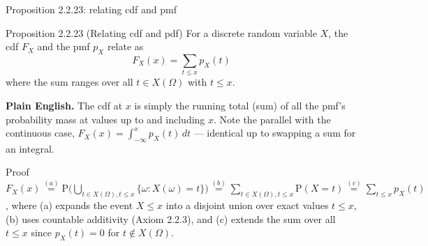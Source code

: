 \documentclass[aspectratio=169,10pt]{beamer}
\begin{document}
\begin{frame}{Proposition 2.2.23: relating cdf and pmf}
\begin{block}{Proposition 2.2.23 (Relating cdf and pdf)}
For a discrete random variable $X$, the cdf $F_X$ and the pmf $p_X$ relate as
\[ F_X(x) = \sum_{t\leq x} p_X(t) \]
where the sum ranges over all $t\in X(\Omega)$ with $t\leq x$.
\end{block}
\textbf{Plain English.} The cdf at $x$ is simply the running total (sum) of
all the pmf's probability mass at values up to and including $x$. Note the
parallel with the continuous case, $F_X(x)=\int_{-\infty}^{x}p_X(t)\,dt$
--- identical up to swapping a sum for an integral.

\begin{block}{Proof}
$F_X(x) \overset{(a)}{=} \mathrm{P}\big(\bigcup_{t\in X(\Omega),t\leq x}\{\omega : X(\omega)=t\}\big)
\overset{(b)}{=}\sum_{t\in X(\Omega),t\leq x}\mathrm{P}(X=t)\overset{(c)}{=}\sum_{t\leq x}p_X(t)$,
where (a) expands the event $X\leq x$ into a disjoint union over exact
values $t\leq x$, (b) uses countable additivity (Axiom 2.2.3), and (c)
extends the sum over all $t\leq x$ since $p_X(t)=0$ for $t\notin X(\Omega)$.
\end{block}
\end{frame}
\end{document}
